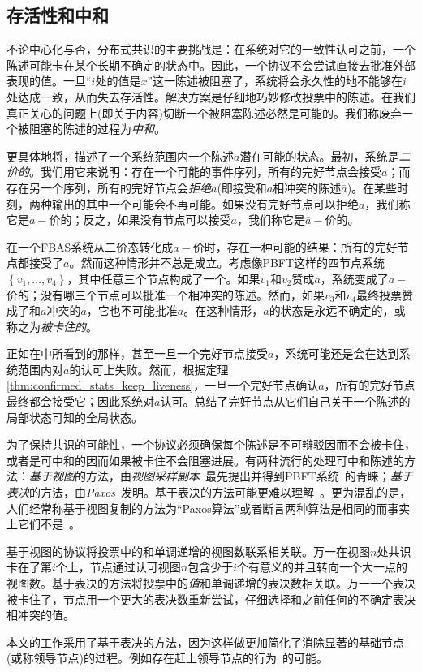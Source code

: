 \subsection{存活性和中和}\label{sec:vote_stuck}

不论中心化与否，分布式共识的主要挑战是：在系统对它的一致性认可之前，一个陈述可能卡在某个长期不确定的状态中。因此，一个协议不会尝试直接去批准外部表现的值。一旦``{\slot}$i$处的值是$x$''这一陈述被阻塞了，系统将会永久性的地不能够在{\slot}$i$处达成一致，从而失去存活性。解决方案是仔细地巧妙修改投票中的陈述。在我们真正关心的问题上(即关于{\slot}内容)切断一个被阻塞陈述必然是可能的。我们称废弃一个被阻塞的陈述的过程为\textit{中和}。

更具体地将，描述了一个系统范围内一个陈述$a$潜在可能的状态。最初，系统是\textit{二价的}。我们用它来说明：存在一个可能的事件序列，所有的完好节点会接受$a$；而存在另一个序列，所有的完好节点会\textit{拒绝}$a$(即接受和$a$相冲突的陈述$\bar a$)。在某些时刻，两种输出的其中一个可能会不再可能。如果没有完好节点可以拒绝$a$，我们称它是$a-\!\!$价的；反之，如果没有节点可以接受$a$，我们称它是$\bar a-\!\!$价的。

在一个FBAS系统从二价态转化成$a-\!\!$价时，存在一种可能的结果：所有的完好节点都接受了$a$。然而这种情形并不总是成立。考虑像PBFT这样的四节点系统$\left\{v_1,\ldots,v_4\right\}$，其中任意三个节点构成了一个{\quorum}。如果$v_1$和$v_2$赞成$a$，系统变成了$a-\!\!$价的；没有哪三个节点可以批准一个相冲突的陈述。然而，如果$v_3$和$v_4$最终投票赞成了和$a$冲突的$\bar a$，它也不可能批准$a$。在这种情形，$a$的状态是永远不确定的，或称之为\textit{被卡住的}。

正如在中所看到的那样，甚至一旦一个完好节点接受$a$，系统可能还是会在达到系统范围内对$a$的认可上失败。然而，根据定理\ref{thm:confirmed_stats_keep_liveness}，一旦一个完好节点确认$a$，所有的完好节点最终都会接受它；因此系统对$a$认可。总结了完好节点从它们自己关于一个陈述的局部状态可知的全局状态。

为了保持共识的可能性，一个协议必须确保每个陈述是不可辩驳因而不会被卡住，或者是可中和的因而如果被卡住不会阻塞进展。有两种流行的处理可中和陈述的方法：\textit{基于视图}的方法，由\textit{视图采样副本}~\cite{Oki:1988:VRN:62546.62549}最先提出并得到PBFT系统~\cite{Castro:1999:PBFT}的青睐；\textit{基于表决}的方法，由\textit{Paxos}~\cite{Lamport:1998:PP:279227.279229}发明。基于表决的方法可能更难以理解~\cite{Ongaro:2014:SUC:2643634.2643666}。更为混乱的是，人们经常称基于视图复制的方法为``Paxos算法''或者断言两种算法是相同的而事实上它们不是~\cite{6894199}。

基于视图的协议将投票中的{\slot}和单调递增的视图数联系相关联。万一在视图$n$处共识卡在了第$i$个{\slot}上，节点通过认可视图$n$包含少于$i$个有意义的{\slot}并且转向一个大一点的视图数。基于表决的方法将投票中的\textit{值}和单调递增的表决数相关联。万一一个表决被卡住了，节点用一个更大的表决数重新尝试，仔细选择和之前任何的不确定表决相冲突的值。

本文的工作采用了基于表决的方法，因为这样做更加简化了消除显著的基础节点(或称领导节点)的过程。例如存在赶上领导节点的行为~\cite{Lamport:2011:BPR:2075029.2075058}的可能。
